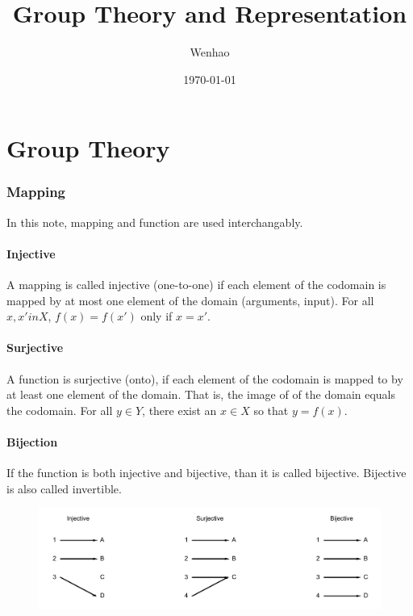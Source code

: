 \documentclass{amsart}
\begin{document}
\title{Group Theory and Representation}
\author{Wenhao}
\date{\today}
\maketitle

\part{Group Theory}

\section*{Mapping}
In this note, mapping and function are used interchangably. 
\subsection*{Injective}
A mapping is called injective (one-to-one) if each element of the codomain is mapped by 
at most one element of the domain (arguments, input). 
For all $x,x' in X$, $f(x)=f(x')$ only if $x=x'$.
\subsection*{Surjective}
A function is surjective (onto), if each element of the codomain is mapped to by at least one element of 
the domain. That is, the image of of the domain equals the codomain. 
For all $y\in Y$, there exist an $x\in X$ so that $y=f(x)$.
\subsection*{Bijection}
If the function is both injective and bijective, than it is called bijective. Bijective is also called invertible.

\begin{figure}[h!]
    \centering
    \includegraphics[width = 5in]{figures/mapping.png}
\end{figure}
\end{document}
